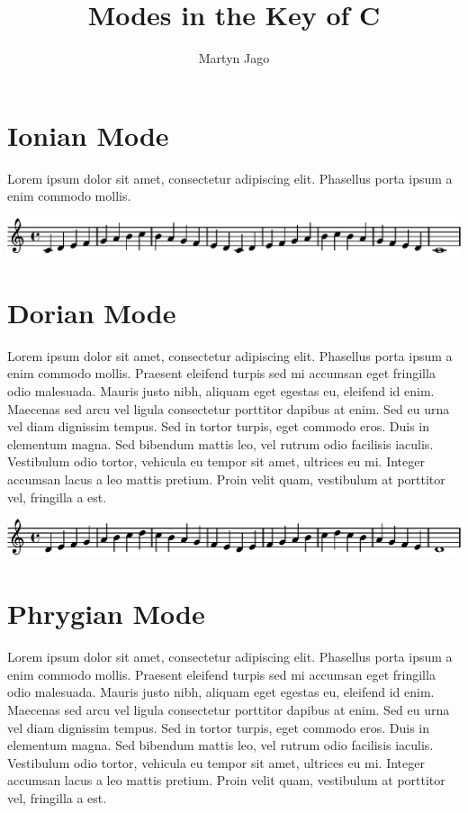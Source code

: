 \documentclass[11pt]{article}
\title{Modes in the Key of C}
\author{Martyn Jago}
\date{}
\begin{document}
\maketitle

\section*{Ionian Mode}
\label{sec-1}

Lorem ipsum dolor sit amet, consectetur adipiscing elit. Phasellus porta ipsum a enim commodo mollis. 
\linebreak


\includegraphics[width=17cm]{ionian.eps}
\section*{Dorian Mode}
\label{sec-2}

Lorem ipsum dolor sit amet, consectetur adipiscing elit. Phasellus porta ipsum a enim commodo mollis. Praesent eleifend turpis sed mi accumsan eget fringilla odio malesuada. Mauris justo nibh, aliquam eget egestas eu, eleifend id enim. Maecenas sed arcu vel ligula consectetur porttitor dapibus at enim. Sed eu urna vel diam dignissim tempus. Sed in tortor turpis, eget commodo eros. Duis in elementum magna. Sed bibendum mattis leo, vel rutrum odio facilisis iaculis. Vestibulum odio tortor, vehicula eu tempor sit amet, ultrices eu mi. Integer accumsan lacus a leo mattis pretium. Proin velit quam, vestibulum at porttitor vel, fringilla a est.
\linebreak


\includegraphics[width=17cm]{dorian.eps}
\section*{Phrygian Mode}
\label{sec-3}

Lorem ipsum dolor sit amet, consectetur adipiscing elit. Phasellus porta ipsum a enim commodo mollis. Praesent eleifend turpis sed mi accumsan eget fringilla odio malesuada. Mauris justo nibh, aliquam eget egestas eu, eleifend id enim. Maecenas sed arcu vel ligula consectetur porttitor dapibus at enim. Sed eu urna vel diam dignissim tempus. Sed in tortor turpis, eget commodo eros. Duis in elementum magna. Sed bibendum mattis leo, vel rutrum odio facilisis iaculis. Vestibulum odio tortor, vehicula eu tempor sit amet, ultrices eu mi. Integer accumsan lacus a leo mattis pretium. Proin velit quam, vestibulum at porttitor vel, fringilla a est.
\linebreak
\end{document}
